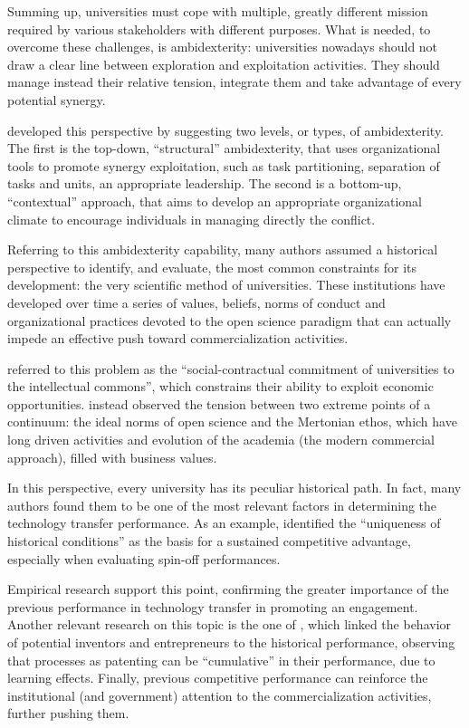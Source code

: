 Summing up, universities must cope with multiple, greatly different mission required by various stakeholders with different purposes. What is needed, to overcome these challenges, is ambidexterity: universities nowadays should not draw a clear line between exploration and exploitation activities. They should manage instead their relative tension, integrate them and take advantage of every potential synergy.

\citet{Chang2016} developed this perspective by suggesting two levels, or types, of ambidexterity. The first is the top-down, \enquote{structural} ambidexterity, that uses organizational tools to promote synergy exploitation, such as task partitioning, separation of tasks and units, an appropriate leadership. The second is a bottom-up, \enquote{contextual} approach, that aims to develop an appropriate organizational climate to encourage individuals in managing directly the conflict.

Referring to this ambidexterity capability, many authors assumed a historical perspective to identify, and evaluate, the most common constraints for its development: the very scientific method of universities. These institutions have developed over time a series of values, beliefs, norms of conduct and organizational practices devoted to the open science paradigm that can actually impede an effective push toward commercialization activities. 

\citet{Argyres1998} referred to this problem as the \enquote{social-contractual commitment of universities to the intellectual commons}, which constrains their ability to exploit economic opportunities. \citet{Muscio2013} instead observed the tension between two extreme points of a continuum: the ideal norms of open science and the Mertonian ethos, which have long driven activities and evolution of the academia (the modern commercial approach), filled with business values.

In this perspective, every university has its peculiar historical path. In fact, many authors found them to be one of the most relevant factors in determining the technology transfer performance. As an example, \citet{OShea2005} identified the \enquote{uniqueness of historical conditions} as the basis for a sustained competitive advantage, especially when evaluating spin-off performances. 

Empirical research support this point, confirming the greater importance of the previous performance in technology transfer in promoting an engagement. Another relevant research on this topic is the one of \citet{Baldini2006}, which linked the behavior of potential inventors and entrepreneurs to the historical performance, observing that processes as patenting can be \enquote{cumulative} in their performance, due to learning effects. Finally, previous competitive performance can reinforce the institutional (and government) attention to the commercialization activities, further pushing them.

